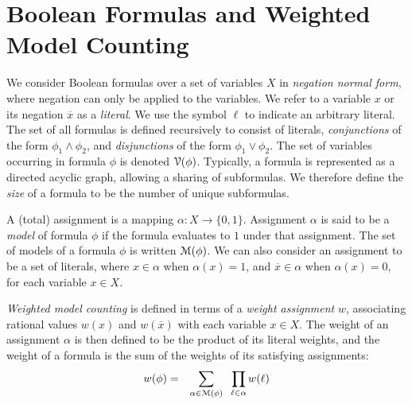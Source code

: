 \documentclass[letterpaper,USenglish,cleveref, autoref, thm-restate]{lipics-v2021}
\newcommand{\obar}[1]{\overline{#1}}
\newcommand{\lit}{\ell}
\newcommand{\varset}{X}
\newcommand{\dependencyset}{{\cal V}}
\newcommand{\assign}{\alpha}
\newcommand{\modelset}{{\cal M}}
\begin{document}
\section{Boolean Formulas and Weighted Model Counting}
\label{sect:background:boolean}

We consider Boolean formulas over a set of variables $\varset$ in
\emph{negation normal form}, where negation can only be applied to the
variables.  We refer to a variable $x$ or its negation $\obar{x}$ as a
\emph{literal}.  We use the symbol $\lit$ to indicate an arbitrary
literal.  The set of all formulas is defined recursively to consist of
literals, \emph{conjunctions} of the form $\phi_1 \land \phi_2$, and
\emph{disjunctions} of the form $\phi_1 \lor \phi_2$.  The set of
variables occurring in formula $\phi$ is denoted
$\dependencyset(\phi)$.  Typically, a formula is represented as a
directed acyclic graph, allowing a sharing of subformulas.  We
therefore define the \emph{size} of a formula to be the number of
unique subformulas.

A (total) assignment is a mapping $\assign \colon \varset \rightarrow
\{0, 1\}$.  Assignment $\assign$ is said to be a \emph{model} of
formula $\phi$ if the formula evaluates to $1$ under that assignment.
The set of models of a formula $\phi$ is written $\modelset(\phi)$.
We can also consider an assignment to be a set of literals, where $x \in \assign$
when $\assign(x) = 1$, and $\obar{x} \in \assign$ when
$\assign(x) = 0$, for each variable $x \in \varset$.

\emph{Weighted model counting} is defined in terms of a \emph{weight
  assignment} $w$, associating rational values $w(x)$ and
$w(\obar{x})$ with each variable $x \in \varset$.
The weight of an
assignment $\assign$ is then defined to be the product of its literal weights, and the weight
of a formula is the sum of the weights of its satisfying assignments:
\begin{eqnarray}
  w(\phi) & = & \sum_{\assign \in \modelset(\phi)} \;\;\prod_{\lit \in \assign} w(\lit) \label{eqn:wmc}
\end{eqnarray}
\end{document}
